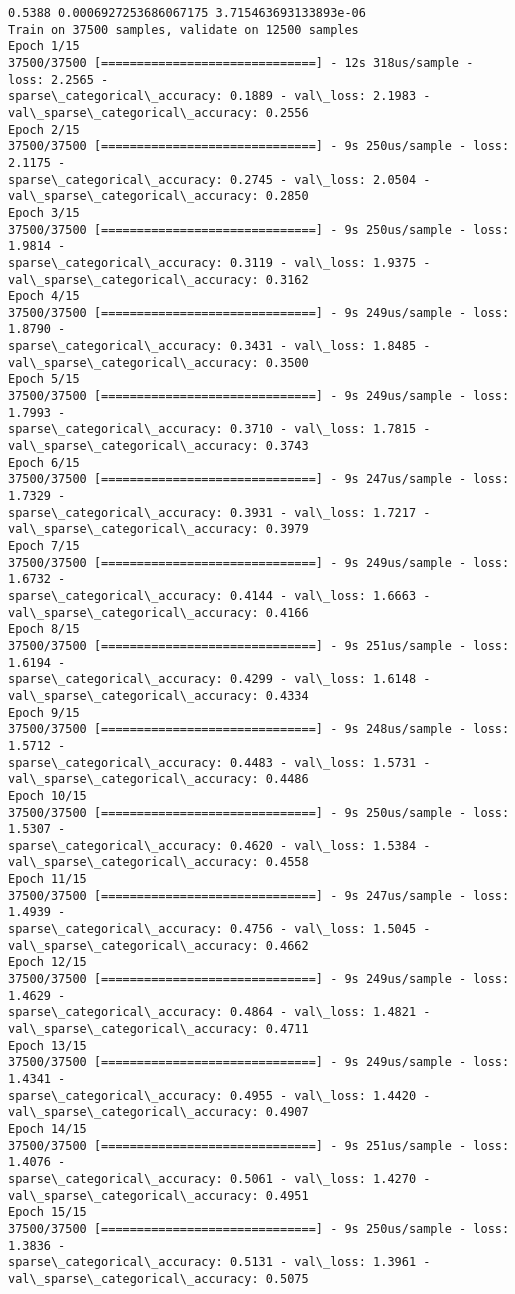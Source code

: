 \documentclass[11pt]{article}
\begin{document}
    \begin{Verbatim}[commandchars=\\\{\}]
0.5388 0.0006927253686067175 3.715463693133893e-06
Train on 37500 samples, validate on 12500 samples
Epoch 1/15
37500/37500 [==============================] - 12s 318us/sample - loss: 2.2565 -
sparse\_categorical\_accuracy: 0.1889 - val\_loss: 2.1983 -
val\_sparse\_categorical\_accuracy: 0.2556
Epoch 2/15
37500/37500 [==============================] - 9s 250us/sample - loss: 2.1175 -
sparse\_categorical\_accuracy: 0.2745 - val\_loss: 2.0504 -
val\_sparse\_categorical\_accuracy: 0.2850
Epoch 3/15
37500/37500 [==============================] - 9s 250us/sample - loss: 1.9814 -
sparse\_categorical\_accuracy: 0.3119 - val\_loss: 1.9375 -
val\_sparse\_categorical\_accuracy: 0.3162
Epoch 4/15
37500/37500 [==============================] - 9s 249us/sample - loss: 1.8790 -
sparse\_categorical\_accuracy: 0.3431 - val\_loss: 1.8485 -
val\_sparse\_categorical\_accuracy: 0.3500
Epoch 5/15
37500/37500 [==============================] - 9s 249us/sample - loss: 1.7993 -
sparse\_categorical\_accuracy: 0.3710 - val\_loss: 1.7815 -
val\_sparse\_categorical\_accuracy: 0.3743
Epoch 6/15
37500/37500 [==============================] - 9s 247us/sample - loss: 1.7329 -
sparse\_categorical\_accuracy: 0.3931 - val\_loss: 1.7217 -
val\_sparse\_categorical\_accuracy: 0.3979
Epoch 7/15
37500/37500 [==============================] - 9s 249us/sample - loss: 1.6732 -
sparse\_categorical\_accuracy: 0.4144 - val\_loss: 1.6663 -
val\_sparse\_categorical\_accuracy: 0.4166
Epoch 8/15
37500/37500 [==============================] - 9s 251us/sample - loss: 1.6194 -
sparse\_categorical\_accuracy: 0.4299 - val\_loss: 1.6148 -
val\_sparse\_categorical\_accuracy: 0.4334
Epoch 9/15
37500/37500 [==============================] - 9s 248us/sample - loss: 1.5712 -
sparse\_categorical\_accuracy: 0.4483 - val\_loss: 1.5731 -
val\_sparse\_categorical\_accuracy: 0.4486
Epoch 10/15
37500/37500 [==============================] - 9s 250us/sample - loss: 1.5307 -
sparse\_categorical\_accuracy: 0.4620 - val\_loss: 1.5384 -
val\_sparse\_categorical\_accuracy: 0.4558
Epoch 11/15
37500/37500 [==============================] - 9s 247us/sample - loss: 1.4939 -
sparse\_categorical\_accuracy: 0.4756 - val\_loss: 1.5045 -
val\_sparse\_categorical\_accuracy: 0.4662
Epoch 12/15
37500/37500 [==============================] - 9s 249us/sample - loss: 1.4629 -
sparse\_categorical\_accuracy: 0.4864 - val\_loss: 1.4821 -
val\_sparse\_categorical\_accuracy: 0.4711
Epoch 13/15
37500/37500 [==============================] - 9s 249us/sample - loss: 1.4341 -
sparse\_categorical\_accuracy: 0.4955 - val\_loss: 1.4420 -
val\_sparse\_categorical\_accuracy: 0.4907
Epoch 14/15
37500/37500 [==============================] - 9s 251us/sample - loss: 1.4076 -
sparse\_categorical\_accuracy: 0.5061 - val\_loss: 1.4270 -
val\_sparse\_categorical\_accuracy: 0.4951
Epoch 15/15
37500/37500 [==============================] - 9s 250us/sample - loss: 1.3836 -
sparse\_categorical\_accuracy: 0.5131 - val\_loss: 1.3961 -
val\_sparse\_categorical\_accuracy: 0.5075
    \end{Verbatim}
\end{document}
